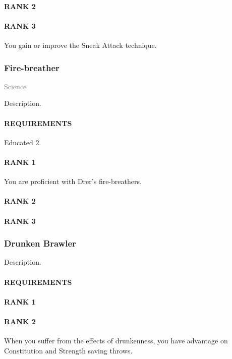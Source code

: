 \paragraph{RANK 2}
\paragraph{RANK 3} You gain or improve the Sneak Attack technique.

\subsubsection{Fire-breather} \label{feat::firebreather}
\small{\textcolor{gray}{Science}}

\normalsize
Description.
\paragraph{REQUIREMENTS} Educated 2.
\paragraph{RANK 1} You are proficient with Drer's fire-breathers.
\paragraph{RANK 2}
\paragraph{RANK 3}

\subsubsection{Drunken Brawler} \label{feat::drunkenbrawler} %
\small{\textcolor{gray}{}}

\normalsize
Description.
\paragraph{REQUIREMENTS}
\paragraph{RANK 1}
\paragraph{RANK 2} When you suffer from the effects of drunkenness, you have advantage on Constitution and Strength saving throws.
